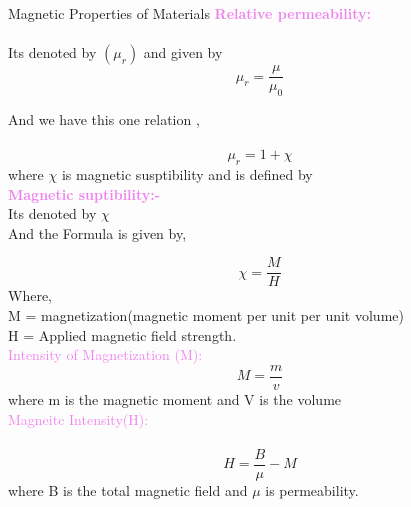 \documentclass{beamer}
\begin{document}
\begin{frame}{Magnetic Properties of Materials}
\textcolor{violet}{\textbf{Relative permeability:}}\\
\\

Its denoted by $(\mu_r)$ and given by \\
\[
\mu_r=\frac{\mu}{\mu_0}
\]

And we have this one relation ,\\\  
   \[
   \mu_r=1+\chi
   \]
   where $\chi$ is magnetic susptibility and is defined by \\
   \textcolor{violet}{\textbf{Magnetic suptibility:-}}\\
  Its denoted by $\chi$  \\
 And the Formula is given  by,\\

\end{frame}


\begin{frame}
 \[
   \chi = \frac{M}{H}
	\]
	Where, \\
	M = magnetization(magnetic moment per unit per unit volume)\\
	H = Applied magnetic field strength.\\
	
\textcolor{violet}{Intensity of Magnetization (M):}\\
\[
M=\frac{m}{v}
\]
where m is the magnetic moment and V is the volume\\
\textcolor{violet}{Magneitc Intensity(H):}\\
\\

\[
H=\frac{B}{\mu}-M
\]
where B is the total magnetic field and $\mu$ is permeability.
\end{frame}
\end{document}
